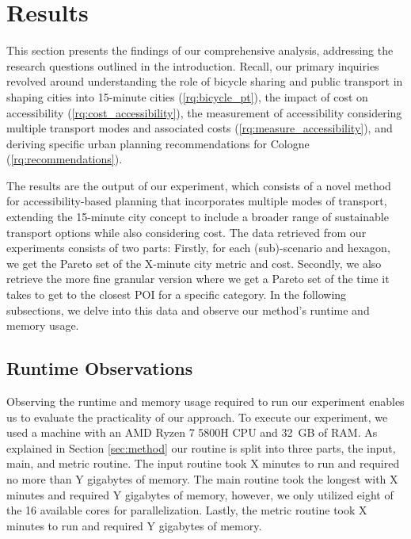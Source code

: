 \clearpage
\section{Results}
\label{sec:results}

This section presents the findings of our comprehensive analysis, addressing the research questions outlined in the introduction.
Recall, our primary inquiries revolved around understanding the role of bicycle sharing and public transport in shaping cities into 15-minute cities (\ref{rq:bicycle_pt}), the impact of cost on accessibility (\ref{rq:cost_accessibility}), the measurement of accessibility considering multiple transport modes and associated costs (\ref{rq:measure_accessibility}), and deriving specific urban planning recommendations for Cologne (\ref{rq:recommendations}).

The results are the output of our experiment, which consists of a novel method for accessibility-based planning that incorporates multiple modes of transport, extending the 15-minute city concept to include a broader range of sustainable transport options while also considering cost.
The data retrieved from our experiments consists of two parts:
Firstly, for each (sub)-scenario and hexagon, we get the Pareto set of the X-minute city metric and cost.
Secondly, we also retrieve the more fine granular version where we get a Pareto set of the time it takes to get to the closest POI for a specific category.
In the following subsections, we delve into this data and observe our method's runtime and memory usage.



\subsection{Runtime Observations}
\label{subsec:runtime_observations}

Observing the runtime and memory usage required to run our experiment enables us to evaluate the practicality of our approach.
To execute our experiment, we used a machine with an AMD Ryzen 7 5800H CPU and 32 GB of RAM.
As explained in Section \ref{sec:method} our routine is split into three parts, the input, main, and metric routine.
The input routine took X minutes to run and required no more than Y gigabytes of memory.
The main routine took the longest with X minutes and required Y gigabytes of memory, however, we only utilized eight of the 16 available cores for parallelization.
Lastly, the metric routine took X minutes to run and required Y gigabytes of memory.

